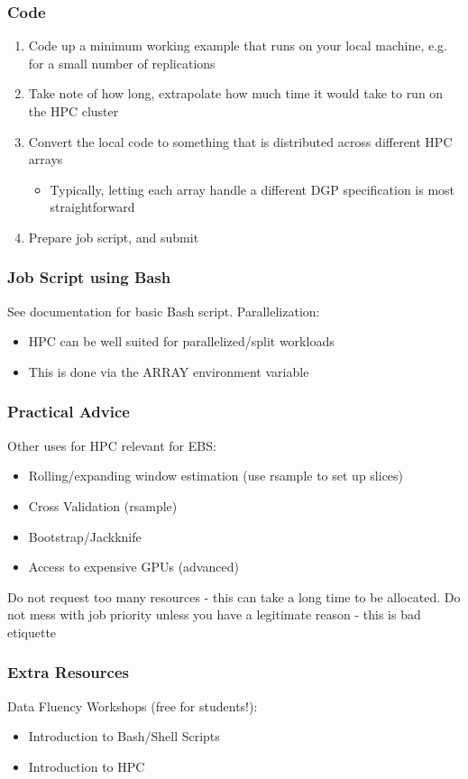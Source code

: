 \documentclass[aspectratio=169,notheorems]{beamer}
\theoremstyle{plain}
\theoremstyle{plain}
\numberwithin{equation}{section}
\begin{document}
\begin{frame}
\frametitle{Code}
\begin{enumerate}
\item Code up a minimum working example that runs on your local machine, e.g. for a small number of replications
\item Take note of how long, extrapolate how much time it would take to run on the HPC cluster
\item Convert the local code to something that is distributed across different HPC arrays
\begin{itemize}
\item Typically, letting each array handle a different DGP specification is most straightforward
\end{itemize}
\item Prepare job script, and submit
\end{enumerate}
\end{frame}

\begin{frame}
\frametitle{Job Script using Bash}
See documentation for basic Bash script.
\medskip
Parallelization:
\begin{itemize}
\item HPC can be well suited for parallelized/split workloads
\item This is done via the ARRAY environment variable
\end{itemize}
\end{frame}

\begin{frame}
\frametitle{Practical Advice}
Other uses for HPC relevant for EBS:
\begin{itemize}
\item Rolling/expanding window estimation (use rsample to set up slices)
\item Cross Validation (rsample)
\item Bootstrap/Jackknife
\item Access to expensive GPUs (advanced)
\end{itemize}
\medskip
Do not request too many resources - this can take a long time to be allocated.
\medskip
Do not mess with job priority unless you have a legitimate reason - this is bad etiquette
\end{frame}

\begin{frame}
\frametitle{Extra Resources}
Data Fluency Workshops (free for students!):
\begin{itemize}
\item Introduction to Bash/Shell Scripts
\item Introduction to HPC
\end{itemize}
\end{frame}
\end{document}
